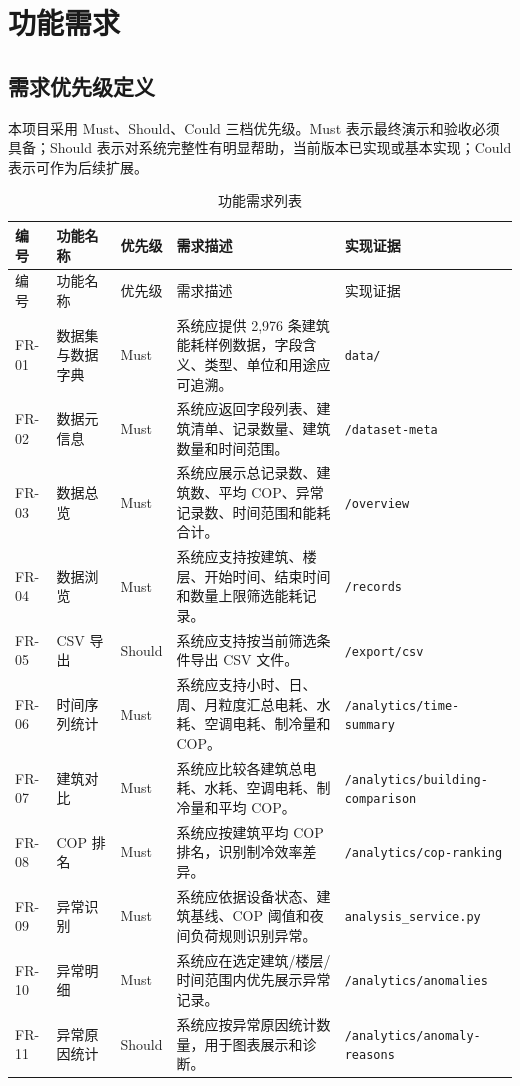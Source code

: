 \documentclass[12pt,a4paper]{ctexart}
\newcommand{\code}[1]{{\footnotesize\nolinkurl{#1}}}
\begin{document}
\section{功能需求}
\subsection{需求优先级定义}
本项目采用 Must、Should、Could 三档优先级。Must 表示最终演示和验收必须具备；Should 表示对系统完整性有明显帮助，当前版本已实现或基本实现；Could 表示可作为后续扩展。

\begin{longtable}{p{2cm}p{3.5cm}p{1.7cm}p{5.3cm}p{2.2cm}}
\caption{功能需求列表}\\
\toprule
编号 & 功能名称 & 优先级 & 需求描述 & 实现证据 \\
\midrule
\endfirsthead
\toprule
编号 & 功能名称 & 优先级 & 需求描述 & 实现证据 \\
\midrule
\endhead
FR-01 & 数据集与数据字典 & Must & 系统应提供 2,976 条建筑能耗样例数据，字段含义、类型、单位和用途应可追溯。 & \code{data/} \\
FR-02 & 数据元信息 & Must & 系统应返回字段列表、建筑清单、记录数量、建筑数量和时间范围。 & \code{/dataset-meta} \\
FR-03 & 数据总览 & Must & 系统应展示总记录数、建筑数、平均 COP、异常记录数、时间范围和能耗合计。 & \code{/overview} \\
FR-04 & 数据浏览 & Must & 系统应支持按建筑、楼层、开始时间、结束时间和数量上限筛选能耗记录。 & \code{/records} \\
FR-05 & CSV 导出 & Should & 系统应支持按当前筛选条件导出 CSV 文件。 & \code{/export/csv} \\
FR-06 & 时间序列统计 & Must & 系统应支持小时、日、周、月粒度汇总电耗、水耗、空调电耗、制冷量和 COP。 & \code{/analytics/time-summary} \\
FR-07 & 建筑对比 & Must & 系统应比较各建筑总电耗、水耗、空调电耗、制冷量和平均 COP。 & \code{/analytics/building-comparison} \\
FR-08 & COP 排名 & Must & 系统应按建筑平均 COP 排名，识别制冷效率差异。 & \code{/analytics/cop-ranking} \\
FR-09 & 异常识别 & Must & 系统应依据设备状态、建筑基线、COP 阈值和夜间负荷规则识别异常。 & \code{analysis_service.py} \\
FR-10 & 异常明细 & Must & 系统应在选定建筑/楼层/时间范围内优先展示异常记录。 & \code{/analytics/anomalies} \\
FR-11 & 异常原因统计 & Should & 系统应按异常原因统计数量，用于图表展示和诊断。 & \code{/analytics/anomaly-reasons} \\

\end{longtable}
\end{document}
